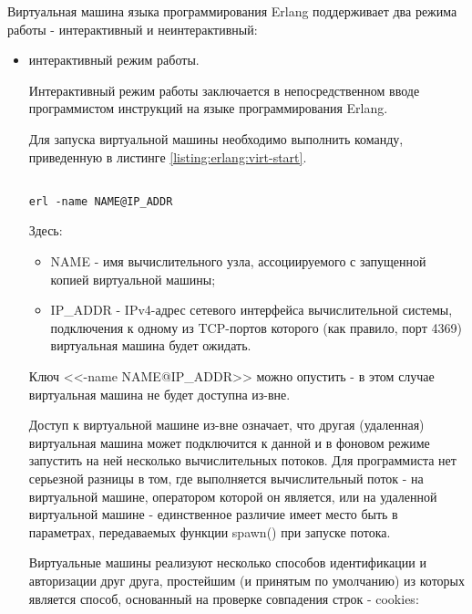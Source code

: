 
Виртуальная машина языка программирования Erlang поддерживает два режима работы - интерактивный и неинтерактивный:

\begin{itemize}

	\item интерактивный режим работы.

	Интерактивный режим работы заключается в непосредственном вводе программистом инструкций на языке программирования Erlang.

	Для запуска виртуальной машины необходимо выполнить команду, приведенную в листинге \ref{listing:erlang:virt-start}.

\begin{lstlisting}

erl -name NAME@IP_ADDR

\end{lstlisting}
\mylistingend

	Здесь:
	
	\begin{itemize}
	
		\item NAME - имя вычислительного узла, ассоциируемого с запущенной копией виртуальной машины;
		\item IP\_ADDR - IPv4-адрес сетевого интерфейса вычислительной системы, подключения к одному из TCP-портов которого (как правило, порт 4369) виртуальная машина будет ожидать.

	\end{itemize}

	Ключ <<-name NAME@IP\_ADDR>> можно опустить - в этом случае виртуальная машина не будет доступна из-вне.

	Доступ к виртуальной машине из-вне означает, что другая (удаленная) виртуальная машина может подключится к данной и в фоновом режиме запустить на ней несколько вычислительных потоков. Для программиста нет серьезной разницы в том, где выполняется вычислительный поток - на виртуальной машине, оператором которой он является, или на удаленной виртуальной машине - единственное различие имеет место быть в параметрах, передаваемых функции spawn() при запуске потока.

	Виртуальные машины реализуют несколько способов идентификации и авторизации друг друга, простейшим (и принятым по умолчанию) из которых является способ, основанный на проверке совпадения строк - cookies:


\end{itemize}
